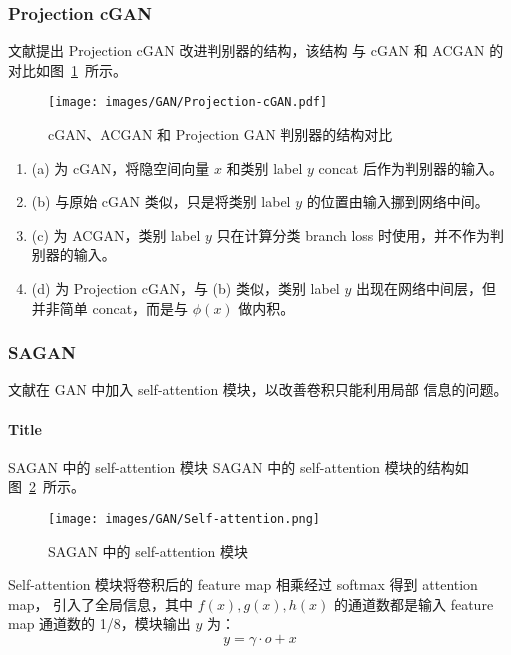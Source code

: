 \subsubsection{Projection cGAN}
文献提出 Projection cGAN 改进判别器的结构，该结构
与 cGAN 和 ACGAN 的对比如图~\ref{fig:projection-gan}~所示。

\begin{figure}[ht]
  \centering
  \texttt{[image: images/GAN/Projection-cGAN.pdf]}
  \caption{cGAN、ACGAN 和 Projection GAN 判别器的结构对比}\label{fig:projection-gan}
\end{figure}

\begin{enumerate}
  \item (a) 为 cGAN，将隐空间向量 $x$ 和类别 label $y$ concat 后作为判别器的输入。
  \item (b) 与原始 cGAN 类似，只是将类别 label $y$ 的位置由输入挪到网络中间。
  \item (c) 为 ACGAN，类别 label $y$ 只在计算分类 branch loss 时使用，并不作为判
    别器的输入。
  \item (d) 为 Projection cGAN，与 (b) 类似，类别 label $y$ 出现在网络中间层，但
    并非简单 concat，而是与 $\phi(x)$ 做内积。
\end{enumerate}

\subsubsection{SAGAN}
文献在 GAN 中加入 self-attention 模块，以改善卷积只能利用局部
信息的问题。

\paragraph{Title}{SAGAN 中的 self-attention 模块}
SAGAN 中的 self-attention 模块的结构如图~\ref{fig:self-attention}~所示。

\begin{figure}[ht]
  \centering
  \texttt{[image: images/GAN/Self-attention.png]}
  \caption{SAGAN 中的 self-attention 模块}\label{fig:self-attention}
\end{figure}

Self-attention 模块将卷积后的 feature map 相乘经过 softmax 得到 attention map，
引入了全局信息，其中 $f(x), g(x), h(x)$ 的通道数都是输入 feature map 通道数的
1/8，模块输出 $y$ 为：
\begin{equation}\label{equ:self-attention}
  y = \gamma \cdot o + x
\end{equation}

